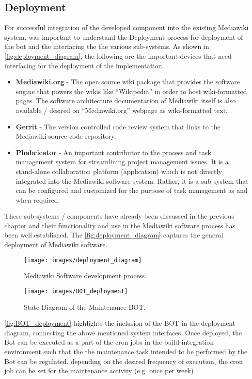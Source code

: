 \subsection{Deployment}
For successful integration of the developed component into the existing Mediawiki system, was important to understand the Deployment process for deployment of the bot and the interfacing the the various sub-systems. As shown in \autoref{fig:deployment_diagram}, the following are the important devices that need interfacing for the deployment of the implementation.  
\begin{itemize}
\item \textbf{Mediawiki.org} \cite{mediawiki} - The open source wiki package that provides the software engine that powers the wikis like \enquote{Wikipedia} in order to host wiki-formatted pages. The software architecture documentation of Mediawiki itself is also available / desired on \enquote{Mediawiki.org} webpage as wiki-formatted text.

\item \textbf{Gerrit} \cite{gerrit} - The version controlled code review system that links to the Mediawiki source code repository.
\item \textbf{Phabricator} \cite{wm-phab} - An important contributor to the process and task management system for streamlining project management issues. It is a stand-alone collaboration platform (application) which is not directly integrated into the Mediawiki software system. Rather, it is a sub-system that can be configured and customized for the purpose of task management as and when required.

\end{itemize}
These sub-systems / components have already been discussed in the previous chapter and their functionality and use in the Mediawiki software process has been well established. The \autoref{fig:deployment_diagram} captures the general deployment of Mediawiki software.
\begin{figure}[H]
  \centering
  \texttt{[image: images/deployment\_diagram]}
  \caption[Mediawiki Software development process]{Mediawiki Software development process.}\label{fig:deployment_diagram}
\end{figure} 
\begin{figure}[H]
  \centering
  \texttt{[image: images/BOT\_deployment]}
  \caption[State Diagram of the Maintenance BOT]{State Diagram of the Maintenance BOT.}\label{fig:BOT_deployment}
\end{figure}
\autoref{fig:BOT_deployment} highlights the inclusion of the BOT in the deployment diagram, connecting the above mentioned system interfaces.
\newline Once deployed, the Bot can be executed as a part of the cron jobs in the build-integration environment such that the the maintenance task intended to be performed by the Bot can be regulated. depending on the desired frequency of execution, the cron job can be set for the maintenance activity (e.g. once per week)


